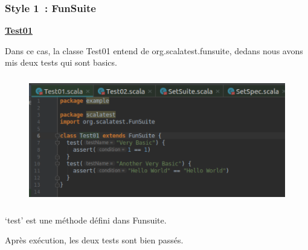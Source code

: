 \documentclass[12pt]{article}
\begin{document}
\subsubsection{Style 1 : FunSuite}

\begin{justify}
{\fontsize{14pt}{16.8pt}\selectfont \textbf{\uline{Test01}}\par}
\end{justify}\par

\begin{justify}
Dans ce cas, la classe Test01 entend de org.scalatest.funsuite, dedans nous avons mis deux tests qui sont basics. 
\end{justify}\par




\begin{figure}[H]
	\begin{Center}
		\includegraphics[width=4.89in,height=2.18in]{./media/image22.png}
	\end{Center}
\end{figure}



\par

\begin{justify}
‘test’ est une méthode défini dans Funsuite.
\end{justify}\par

\begin{justify}
Après exécution, les deux tests sont bien passés.
\end{justify}\par
\end{document}
